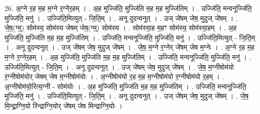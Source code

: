 \documentclass[17pt]{extarticle}
\begin{document}
26. अ॒ग्ने र॒ह म॒ह म॒ग्ने र॒ग्नेर॒हम् । . अ॒ह मुज्जि॑ति॒ मुज्जि॑ति म॒ह म॒ह मुज्जि॑तिम् । . उज्जि॑ति॒ मन्वनूज्जि॑ति॒ मुज्जि॑ति॒ मनु॑ । . उज्जि॑ति॒मित्युत् - जि॒ति॒म् । . अनू दुदन्वनूत् । . उज् जे॑षम् जेष॒ मुदुज् जे॑षम् । . जे॒ष॒(ग्म्॒) सोम॑स्य॒ सोम॑स्य जेषम् जेष॒(ग्म्॒) सोम॑स्य । . सोम॑स्या॒ह म॒हꣳ सोम॑स्य॒ सोम॑स्या॒हम् । . अ॒ह मुज्जि॑ति॒ मुज्जि॑ति म॒ह म॒ह मुज्जि॑तिम् । . उज्जि॑ति॒ मन्वनूज्जि॑ति॒ मुज्जि॑ति॒ मनु॑ । . उज्जि॑ति॒मित्युत् - जि॒ति॒म् । . अनू दुदन्वनूत् । . उज् जे॑षम् जेष॒ मुदुज् जे॑षम् । . जे॒ष॒ म॒ग्ने र॒ग्नेर् जे॑षम् जेष म॒ग्नेः । . अ॒ग्ने र॒ह म॒ह म॒ग्ने र॒ग्नेर॒हम् । . अ॒ह मुज्जि॑ति॒ मुज्जि॑ति म॒ह म॒ह मुज्जि॑तिम् । . उज्जि॑ति॒ मन्वनूज्जि॑ति॒ मुज्जि॑ति॒ मनु॑ । . उज्जि॑ति॒मित्युत् - जि॒ति॒म् । . अनू दुदन्वनूत् । . उज् जे॑षम् जेष॒ मुदुज् जे॑षम् । . जे॒ष॒ म॒ग्नीषोम॑यो र॒ग्नीषोम॑योर् जेषम् जेष म॒ग्नीषोम॑योः । . अ॒ग्नीषोम॑यो र॒ह म॒ह म॒ग्नीषोम॑यो र॒ग्नीषोम॑यो र॒हम् । . अ॒ग्नीषोम॑यो॒रित्य॒ग्नी - सोम॑योः । . अ॒ह मुज्जि॑ति॒ मुज्जि॑ति म॒ह म॒ह मुज्जि॑तिम् । . उज्जि॑ति॒ मन्वनूज्जि॑ति॒ मुज्जि॑ति॒ मनु॑ । . उज्जि॑ति॒मित्युत् - जि॒ति॒म् । . अनू दुदन्वनूत् । . उज् जे॑षम् जेष॒ मुदुज् जे॑षम् । . जे॒ष॒ मि॒न्द्रा॒ग्नि॒यो रि॑न्द्राग्नि॒योर् जे॑षम् जेष मिन्द्राग्नि॒योः । \newline
\end{document}

